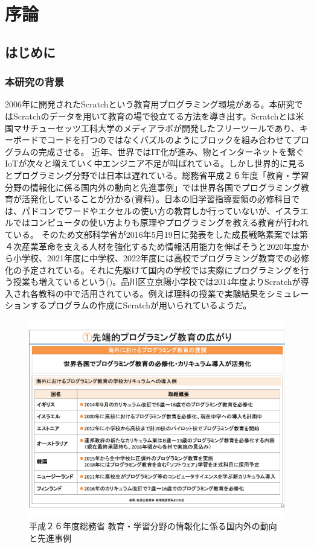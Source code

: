 \documentclass[a4paper,10pt,onecolumn,oneside,openany]{jsbook}
\begin{document}
\tableofcontents

\mainmatter

\part{序論} 
\chapter{はじめに}
\section{本研究の背景}
2006年に開発されたScratchという教育用プログラミング環境がある。本研究ではScratchのデータを用いて教育の場で役立てる方法を導き出す。Scratchとは米国マサチューセッツ工科大学のメディアラボが開発したフリーツールであり、キーボードでコードを打つのではなくパズルのようにブロックを組み合わせてプログラムの完成させる。
近年、世界ではIT化が進み、物とインターネットを繋ぐIoTが次々と増えていく中エンジニア不足が叫ばれている。しかし世界的に見るとプログラミング分野では日本は遅れている。総務省平成２６年度「教育・学習分野の情報化に係る国内外の動向と先進事例」では世界各国でプログラミング教育が活発化していることが分かる(資料\cite{itedu}）。日本の旧学習指導要領の必修科目では、パドコンでワードやエクセルの使い方の教育しか行っていないが、イスラエルではコンピュータの使い方よりも原理やプログラミングを教える教育が行われている。
そのため文部科学省が2016年5月19日に発表をした成長戦略素案では第４次産業革命を支える人材を強化するため情報活用能力を伸ばそうと2020年度から小学校、2021年度に中学校、2022年度には高校でプログラミング教育での必修化の予定されている。それに先駆けて国内の学校では実際にプログラミングを行う授業も増えているという(\cite{edu_prog})。品川区立京陽小学校では2014年度よりScratchが導入され各教科の中で活用されている。例えば理科の授業で実験結果をシミュレーションするプログラムの作成にScratchが用いられているようだ。
\begin{figure}[h]
  \centering
    \includegraphics[scale=0.4]{graphic/foreign_data.pdf}
  \caption{平成２６年度総務省 教育・学習分野の情報化に係る国内外の動向と先進事例}
  \label{itedu}
 \end{figure}
 
\end{document}
